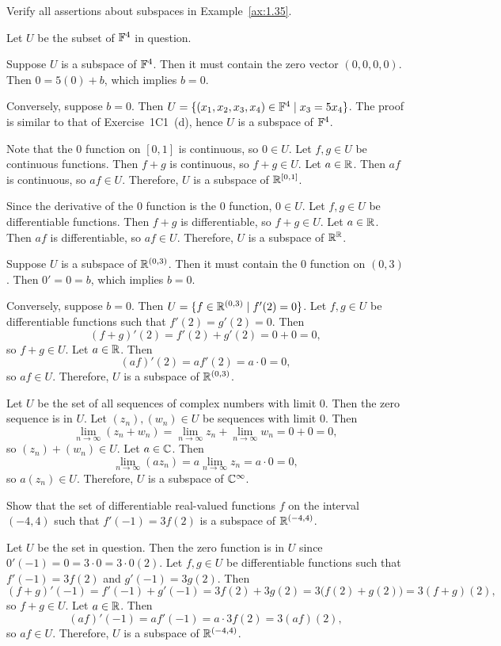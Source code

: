 \begin{exc}
\begin{exercise}
Verify all assertions about subspaces in Example~\ref{ax:1.35}.
\end{exercise}
\begin{solution}
Let $U$ be the subset of $\mathbb{F}^4$ in question.
\begin{parts}
\item Suppose $U$ is a subspace of $\mathbb{F}^4$. Then it must contain the zero vector
  $(0,0,0,0)$. Then $0=5(0)+b$, which implies $b=0$.

  Conversely, suppose $b=0$. Then
  $U=\{(x_1,x_2,x_3,x_4)\in\mathbb{F}^4 \mid x_3=5x_4\}$. The proof is similar to that
  of Exercise~1C1~(d), hence $U$ is a subspace of $\mathbb{F}^4$.
\item Note that the $0$ function on $[0,1]$ is continuous, so $0\in U$. Let
  $f,g\in U$ be continuous functions. Then $f+g$ is continuous, so $f+g\in U$.
  Let $a\in\mathbb{R}$. Then $af$ is continuous, so $af\in U$. Therefore, $U$ is a
  subspace of $\mathbb{R}^{[0,1]}$.
\item Since the derivative of the $0$ function is the $0$ function, $0\in U$.
  Let $f,g\in U$ be differentiable functions. Then $f+g$ is differentiable, so
  $f+g\in U$. Let $a\in\mathbb{R}$. Then $af$ is differentiable, so $af\in U$.
  Therefore, $U$ is a subspace of $\mathbb{R}^{\mathbb{R}}$.
\item Suppose $U$ is a subspace of $\mathbb{R}^{(0,3)}$. Then it must contain the $0$
  function on $(0,3)$. Then $0'=0=b$, which implies $b=0$.

  Conversely, suppose $b=0$. Then $U=\{f\in\mathbb{R}^{(0,3)} \mid f'(2)=0\}$. Let
  $f,g\in U$ be differentiable functions such that $f'(2)=g'(2)=0$. Then
  \[ (f+g)'(2) = f'(2)+g'(2) = 0+0 = 0, \]
  so $f+g\in U$. Let $a\in\mathbb{R}$. Then
  \[ (af)'(2) = af'(2) = a\cdot0 = 0, \]
  so $af\in U$. Therefore, $U$ is a subspace of $\mathbb{R}^{(0,3)}$.
\item Let $U$ be the set of all sequences of complex numbers with limit $0$.
  Then the zero sequence is in $U$. Let $(z_n),(w_n)\in U$ be sequences with
  limit $0$. Then
  \[ \lim_{n\to\infty}(z_n+w_n) = \lim_{n\to\infty}z_n+\lim_{n\to\infty}w_n
     = 0+0 = 0, \]
  so $(z_n)+(w_n)\in U$. Let $a\in\mathbb{C}$. Then
  \[ \lim_{n\to\infty}(az_n) = a\lim_{n\to\infty}z_n = a\cdot0 = 0, \]
  so $a(z_n)\in U$. Therefore, $U$ is a subspace of $\mathbb{C}^\infty$.
\end{parts}
\end{solution}

\begin{exercise}
Show that the set of differentiable real-valued functions $f$ on the interval
$(-4,4)$ such that $f'(-1)=3f(2)$ is a subspace of $\mathbb{R}^{(-4,4)}$.
\end{exercise}
\begin{solution}
Let $U$ be the set in question. Then the zero function is in $U$ since
$0'(-1)=0=3\cdot0=3\cdot0(2)$. Let $f,g\in U$ be differentiable functions such
that $f'(-1)=3f(2)$ and $g'(-1)=3g(2)$. Then
\[ (f+g)'(-1) = f'(-1)+g'(-1) = 3f(2)+3g(2) = 3\bigl(f(2)+g(2)\bigr)
   = 3(f+g)(2), \]
so $f+g\in U$. Let $a\in\mathbb{R}$. Then
\[ (af)'(-1) = af'(-1) = a\cdot3f(2) = 3(af)(2), \]
so $af\in U$. Therefore, $U$ is a subspace of $\mathbb{R}^{(-4,4)}$.
\end{solution}


\end{exc}
